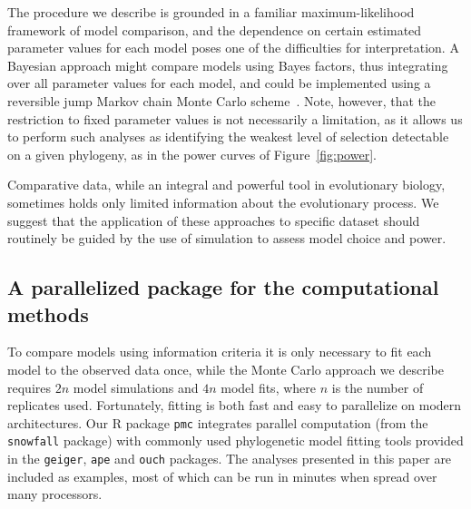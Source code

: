 The procedure we describe is grounded in a familiar maximum-likelihood framework of model comparison, 
and the dependence on certain estimated parameter values for each model poses one of the difficulties for interpretation.
A Bayesian approach might compare models using Bayes factors, 
thus integrating over all parameter values for each model,
and could be implemented using a reversible jump Markov chain Monte Carlo scheme~\citep{Green1995a}.
Note, however, that the restriction to fixed parameter values is not necessarily a limitation,
as it allows us to
perform such analyses as identifying the weakest level of selection detectable on a given phylogeny,
as in the power curves of Figure~\ref{fig:power}.

Comparative data, while an integral and powerful tool in evolutionary biology,
sometimes holds only limited information about the evolutionary process.
We suggest that the application of these approaches to specific dataset should routinely be guided 
by the use of simulation to assess model choice and power.

\subsection{A parallelized package for the computational methods}
To compare models using information criteria it is only necessary to fit each model to the observed data once,
while the Monte Carlo approach we describe requires $2n$ model simulations and $4n$ model fits, where $n$ is the number of replicates used.
Fortunately, fitting is both fast and easy to parallelize on modern architectures.
Our R package \texttt{pmc} integrates parallel computation (from the \texttt{snowfall} package) 
with commonly used phylogenetic model fitting tools
provided in the \texttt{geiger}, \texttt{ape} and \texttt{ouch} packages. 
The analyses presented in this paper are included as examples, most of which can be run in minutes when spread over many processors.   


